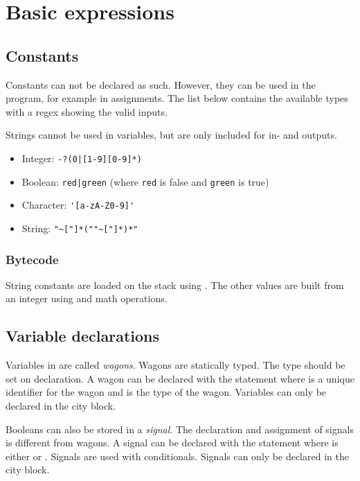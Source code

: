\section{Basic expressions}

\subsection{Constants}

Constants can not be declared as such. However, they can be used in the program, for example in assignments. The list below contains the available types with a regex showing the valid inputs.

Strings cannot be used in variables, but are only included for in- and outputs.

\begin{itemize}
\item Integer: \verb=-?(0|[1-9][0-9]*)=
\item Boolean: \verb=red|green= (where \verb|red| is false and \verb|green| is true)
\item Character: \verb='[a-zA-Z0-9]'=
\item String: \verb="~["]*(""~["]*)*"=
\end{itemize}

\subsubsection*{Bytecode}

String constants are loaded on the stack using . The other values are built from an integer using  and math operations.

\subsection{Variable declarations}

Variables in \shortname are called \emph{wagons}. Wagons are statically typed. The type should be set on declaration.
A wagon can be declared with the statement  where  is a unique identifier for the wagon and  is the type of the wagon. Variables can only be declared in the  city block.

Booleans can also be stored in a \emph{signal}. The declaration and assignment of signals is different from wagons. A signal can be declared with the statement  where  is either  or . Signals are used with conditionals. Signals can only be declared in the  city block.

